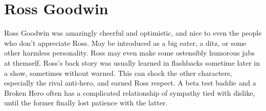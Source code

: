 \documentclass[12pt]{book}
\begin{document}
\chapter{Ross Goodwin}

Ross Goodwin was amazingly cheerful and optimistic, and nice to even the people who don't appreciate Ross. May be introduced as a big eater, a ditz, or some other harmless personality. Ross may even make some ostensibly humorous jabs at themself. Ross's back story was usually learned in flashbacks sometime later in a show, sometimes without warned. This can shock the other characters, especially the rival anti-hero, and earned Ross respect. A beta test baddie and a Broken Hero often has a complicated relationship of sympathy tied with dislike, until the former finally lost patience with the latter.
\end{document}
